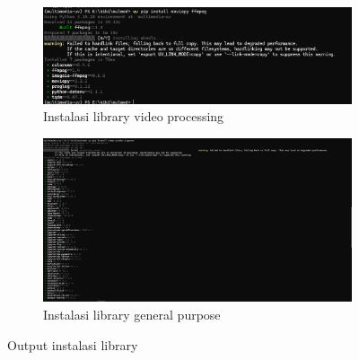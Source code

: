 \documentclass[11pt,a4paper]{article}
\begin{document}
\begin{itemize}
\begin{figure}[h]
            \begin{subfigure}{0.48\textwidth}
                \includegraphics[width=\linewidth]{Figure/InstallVideo.png}
                \caption{Instalasi library video processing}
            \end{subfigure}
            \begin{subfigure}{0.48\textwidth}
                \includegraphics[width=\linewidth]{Figure/InstallGeneral.png}
                \caption{Instalasi library general purpose}
            \end{subfigure}

            \caption{Output instalasi library}
        \end{figure}


\end{itemize}
\end{document}
